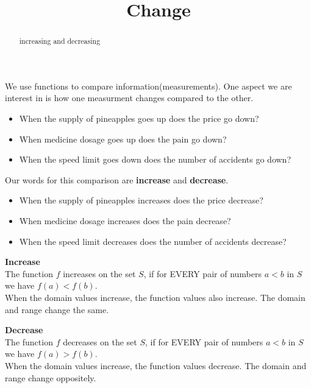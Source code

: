 \documentclass{ximera}
\title{Change}
\begin{document}
\begin{abstract}
increasing and decreasing
\end{abstract}
\maketitle



We use functions to compare information(measurements). One aspect we are interest in is how one measurment changes compared to the other. 


\begin{itemize}
\item When the supply of pineapples goes up does the price go down?
\item When medicine dosage goes up does the pain go down?
\item When the speed limit goes down does the number of accidents go down?
\end{itemize}


Our words for this comparison are \textbf{increase} and \textbf{decrease}.


\begin{itemize}
\item When the supply of pineapples increases does the price decrease?
\item When medicine dosage increases does the pain decrease?
\item When the speed limit decreases does the number of accidents decrease?
\end{itemize}




\begin{definition} \textbf{\textcolor{green!50!black}{Increase}} \\

The function $f$ increases on the set $S$, if for EVERY pair of numbers $a < b$ in $S$ we have  $f(a) < f(b)$. \\

When the domain values increase, the function values also increase.  The domain and range change the same.


\end{definition}



\begin{definition} \textbf{\textcolor{green!50!black}{Decrease}} \\

The function $f$ decreases on the set $S$, if for EVERY pair of numbers $a < b$ in $S$ we have  $f(a) > f(b)$. \\

When the domain values increase, the function values decrease.  The domain and range change oppositely.


\end{definition}
\end{document}

